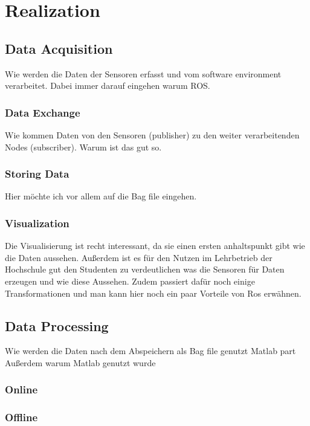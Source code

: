 \chapter{Realization}\label{ch:realization}

\section{Data Acquisition}\label{ch:realization:sec:dataAcquisition}
	Wie werden die Daten der Sensoren erfasst und vom software environment verarbeitet.
	Dabei immer darauf eingehen warum ROS\@.
	\subsection{Data Exchange}\label{ch:realization:ssec:dataExchange}
	Wie kommen Daten von den Sensoren (publisher) zu den weiter verarbeitenden Nodes (subscriber). Warum ist das gut so.
	\subsection{Storing Data}\label{ch:realization:ssec:storingData}
	Hier möchte ich vor allem auf die Bag file eingehen.
	\subsection{Visualization}\label{ch:realization:ssec:visualization}
	Die Visualisierung ist recht interessant, da sie einen ersten anhaltspunkt gibt wie die Daten aussehen. Außerdem ist es für den Nutzen im Lehrbetrieb der Hochschule gut den Studenten zu verdeutlichen was die Sensoren für Daten erzeugen und wie diese Aussehen.
	Zudem passiert dafür noch einige Transformationen und man kann hier noch ein paar Vorteile von Ros erwähnen.
\section{Data Processing}\label{ch:realization:sec:dataProcessing}
	Wie werden die Daten nach dem Abspeichern als Bag file genutzt Matlab part
	Außerdem warum Matlab genutzt wurde
	\subsection{Online}\label{ch:realization:ssec:online}
	\subsection{Offline}\label{ch:realization:ssec:offline}
